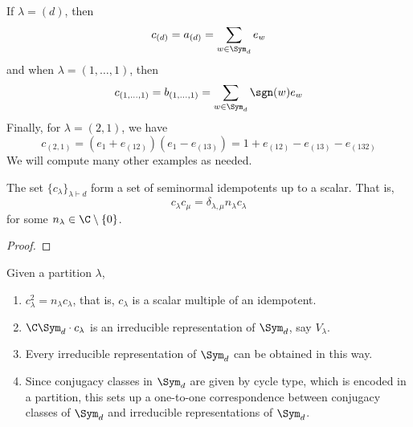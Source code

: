 \documentclass[11pt,leqno,oneside]{amsart}
\numberwithin{thm}{section}
\newcommand{\partitionof}{\vdash}
\begin{document}
\begin{example}
  If \(\lambda = (d)\), then \[
    c_{(d)} = a_{(d)} = \sum_{w \in \Sym_d} e_w
  \]
  and when \(\lambda = (1,\ldots,1)\), then \[
    c_{(1,\ldots,1)} = b_{(1, \ldots, 1)} = \sum_{w \in \Sym_d}
    \sgn(w)e_w
  \]
  Finally, for \(\lambda = (2,1)\), we have \[
    c_{(2,1)} = (e_1+e_{(12)})(e_1-e_{(13)}) = 1 +
    e_{(12)}-e_{(13)}-e_{(132)} 
  \]
  We will compute many other examples as needed.
\end{example}
\begin{prop}
  The set \(\{c_\lambda\}_{\lambda \partitionof d}\) form a set of
  seminormal idempotents up to a scalar. That is, \[
    c_\lambda c_\mu = \delta_{\lambda,\mu} n_\lambda c_\lambda
  \]
  for some \(n_\lambda \in \C \setminus \{0\}\).
\end{prop}
\begin{proof}
  
\end{proof}
\begin{thm}
  Given a partition \(\lambda\),
  \begin{enumerate}
  \item \(c_\lambda^2 = n_\lambda c_\lambda\), that is, \(c_\lambda\)
    is a scalar multiple of an idempotent.
  \item \(\C \Sym_d \cdot c_\lambda\) is an irreducible representation
    of \(\Sym_d\), say \(V_\lambda\).
  \item Every irreducible representation of \(\Sym_d\) can be obtained
    in this way.
  \item Since conjugacy classes in \(\Sym_d\) are given by cycle type,
    which is encoded in a partition, this sets up a one-to-one
    correspondence between conjugacy classes of \(\Sym_d\) and
    irreducible representations of \(\Sym_d\).
  \end{enumerate}
\end{thm}
\end{document}
